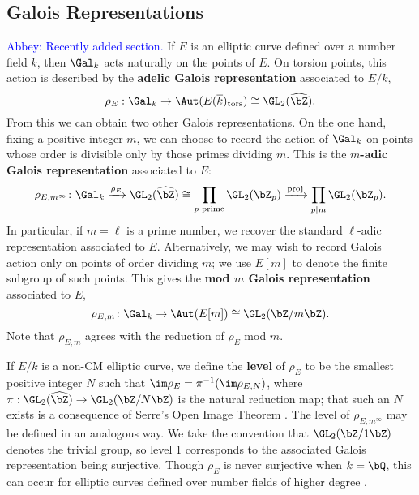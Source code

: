 \documentclass[11pt,reqno]{amsart}
\theoremstyle{plain}
\theoremstyle{definition}
\newcommand{\Q}{\bQ}
\newcommand{\Z}{\bZ}
\newcommand{\proj}{\operatorname{proj}}
\newcommand{\abbey}[1]{\textcolor{blue}{Abbey: #1}}
\newcommand{\abedit}[1]{{\color{blue} #1}}
\begin{document}
\subsection{Galois Representations}\abbey{Recently added section.} If $E$ is an elliptic curve defined over a number field $k$, then $\Gal_k$ acts naturally on the points of $E$. On torsion points, this action is described by the \textbf{adelic Galois representation} associated to $E/k$, 
\[
\rho_{E}: \Gal_k \rightarrow \Aut(E(\overline{k})_{\text{tors}}) \cong \GL_2(\widehat{\Z}). 
\]
From this we can obtain two other Galois representations. On the one hand, fixing a positive integer $m$, we can choose to record the action of $\Gal_k$ on points \abedit{whose order is divisible only by those primes dividing $m$}. This is the \textbf{$m$-adic Galois representation} associated to $E$: 
\[
\rho_{E,m^{\infty}}\colon \Gal_k \xrightarrow{\rho_E} \GL_2(\widehat{\Z}) \cong  \prod_{p \text{ prime}} \GL_2(\Z_{p}) \xrightarrow{\proj} \prod_{p \mid m} \GL_2(\Z_{p}).
\]
In particular, if $m=\ell$ is a prime number, we recover the standard $\ell$-adic representation associated to $E$. Alternatively, we may wish to record Galois action only on points of order dividing $m$; we use $E[m]$ to denote the finite subgroup of such points. This gives the \textbf{mod $m$ Galois representation} associated to $E$,
\[
\rho_{E,m}\colon \Gal_k \rightarrow \Aut(E[m]) \cong \GL_2(\Z/m\Z).
\]
Note that $\rho_{E,m}$ agrees with the reduction of $\rho_E$ mod $m$.

If $E/k$ is a non-CM elliptic curve, we define the \textbf{level} of $\rho_E$ to be the smallest positive integer $N$ such that $\im \rho_E=\pi^{-1}(\im \rho_{E,N})$, where $\pi:\GL_2(\widehat{\Z}) \rightarrow \GL_2(\Z/N\Z)$ is the natural reduction map; that such an $N$ exists is a consequence of Serre's Open Image Theorem \cite{serre72}. The level of $\rho_{E,m^{\infty}}$ may be defined in an analogous way. We take the convention that $\GL_2(\Z/1\Z)$ denotes the trivial group, so level 1 corresponds to the associated Galois representation being surjective. Though $\rho_E$ is never surjective when $k=\Q$, this can occur for elliptic curves defined over number fields of higher degree \cite[Theorem 1.2]{Greicius2010}.

\end{document}
